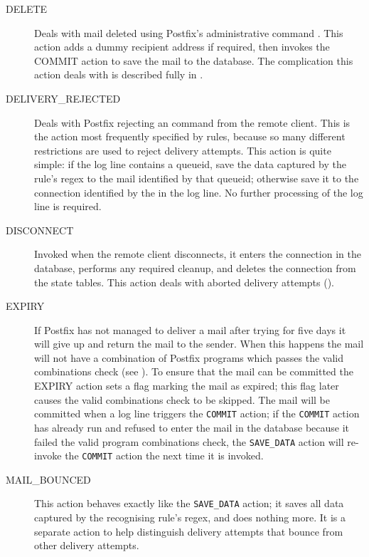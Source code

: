 \begin{description}
    \item [DELETE] Deals with mail deleted using Postfix's administrative
        command .  This action adds a dummy recipient
        address if required, then invokes the COMMIT action to save the
        mail to the database.  The complication this action deals with is
        described fully in .

    \item [DELIVERY\_REJECTED] Deals with Postfix rejecting an
         command from the remote client.  This is the action
        most frequently specified by rules, because so many different
        restrictions are used to reject delivery attempts.  This action is
        quite simple: if the log line contains a queueid, save the data
        captured by the rule's regex to the mail identified by that
        queueid; otherwise save it to the connection identified by the
         in the log line.  No further processing of the log
        line is required.

    \item [DISCONNECT] Invoked when the remote client disconnects, it
        enters the connection in the database, performs any required
        cleanup, and deletes the connection from the state tables.  This
        action deals with aborted delivery attempts ().

    \item [EXPIRY] If Postfix has not managed to deliver a mail after
        trying for five days it will give up and return the mail to the
        sender.  When this happens the mail will not have a combination of
        Postfix programs which passes the valid combinations check (see
        ).  To ensure that the mail can
        be committed the EXPIRY action sets a flag marking the mail as
        expired; this flag later causes the valid combinations check to be
        skipped.  The mail will be committed when a log line triggers the
        \texttt{COMMIT} action; if the \texttt{COMMIT} action has already
        run and refused to enter the mail in the database because it failed
        the valid program combinations check, the \texttt{SAVE\_DATA}
        action will re-invoke the \texttt{COMMIT} action the next time it
        is invoked.

    \item [MAIL\_BOUNCED] This action behaves exactly like the
        \texttt{SAVE\_DATA} action; it saves all data captured by the
        recognising rule's regex, and does nothing more.  It is a separate
        action to help distinguish delivery attempts that bounce from other
        delivery attempts.


\end{description}
